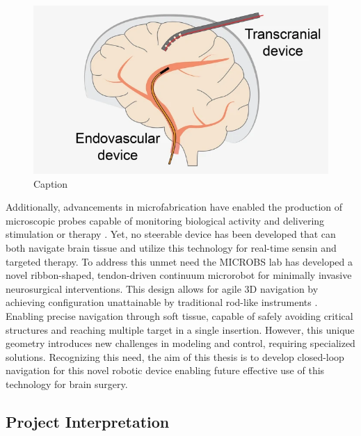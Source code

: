 \begin{figure} [H]
    \centering
    \includegraphics[width=0.8\linewidth]{images/brainsurgery/endovascularVsTranscranial.png}
    \caption{Caption}
    \label{fig:enter-label}
\end{figure}


Additionally, advancements in microfabrication have enabled the production of microscopic probes capable of monitoring biological activity and delivering stimulation or therapy \cite{chen_neural_2017} \cite{frank_next-generation_2019}. Yet, no steerable device has been developed that can both navigate brain tissue and utilize this technology for real-time sensin and targeted therapy. 
\newline \newline
To address this unmet need the MICROBS lab has developed a novel ribbon-shaped, tendon-driven continuum microrobot for minimally invasive neurosurgical interventions. This design allows for agile 3D navigation by achieving configuration unattainable by traditional rod-like instruments \cite{noseda_flat_2024}. Enabling precise navigation through soft tissue, capable of safely avoiding critical structures and reaching multiple target in a single insertion. However, this unique geometry introduces new challenges in modeling and control, requiring specialized solutions. Recognizing this need, the aim of this thesis is to develop closed-loop navigation for this novel robotic device enabling future effective use of this technology for brain surgery. 





\subsection{Project Interpretation}

